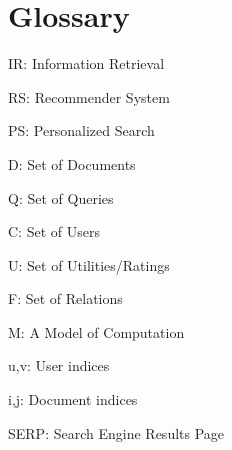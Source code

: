 \chapter*{Glossary}

\begin{itemize*}
  \item IR: Information Retrieval 
  \item RS: Recommender System
  \item PS: Personalized Search
  \item D:  Set of Documents
  \item Q:  Set of Queries  
  \item C:  Set of Users
  \item U:  Set of Utilities/Ratings
  \item F:  Set of Relations
  \item M:  A Model of Computation
  \item u,v: User indices
  \item i,j: Document indices
  \item SERP: Search Engine Results Page
\end{itemize*}



